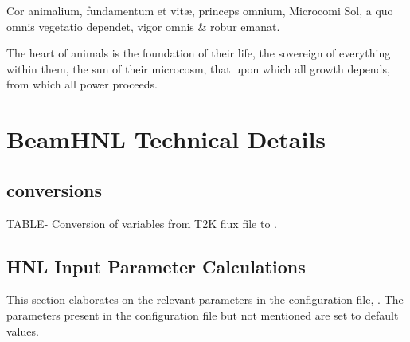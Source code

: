 \begin{savequote}[8cm]
\textlatin{Cor animalium, fundamentum e\longs t vitæ, princeps omnium, Microco\longs mi Sol, a quo omnis vegetatio dependet, vigor omnis \& robur emanat.}

The heart of animals is the foundation of their life, the sovereign of everything within them, the sun of their microcosm, that upon which all growth depends, from which all power proceeds.
\end{savequote}

\chapter{\label{app:hnl}BeamHNL Technical Details}

\minitoc

\section{ conversions}
\label{sec:app-hnl-dk2nu}

    TABLE- Conversion of variables from T2K flux file to .

\section{HNL Input Parameter Calculations}
\label{sec:app-hnl-input}
    This section elaborates on the relevant parameters in the \genie {} configuration file, . 
    The parameters present in the configuration file but not mentioned are set to default values.
    
